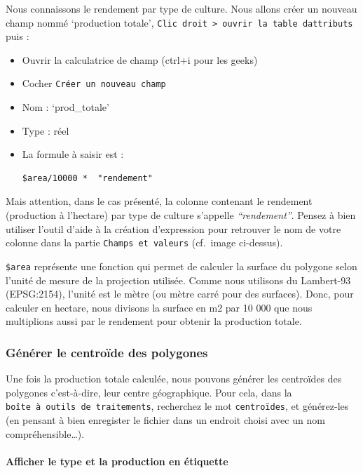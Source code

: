 Nous connaissons le rendement par type de culture. Nous allons créer un
nouveau champ nommé `production totale',
\texttt{Clic\ droit\ \textgreater{}\ ouvrir\ la\ table\ d\textquotesingle{}attributs}
puis :

\begin{itemize}
\item
  Ouvrir la calculatrice de champ (ctrl+i pour les geeks)
\item
  Cocher \texttt{Créer\ un\ nouveau\ champ}
\item
  Nom : `prod\_totale'
\item
  Type : réel
\item
  La formule à saisir est :

\begin{verbatim}
$area/10000 *  "rendement"
\end{verbatim}
\end{itemize}

Mais attention, dans le cas présenté, la colonne contenant le rendement
(production à l'hectare) par type de culture s'appelle
\emph{``rendement''}. Pensez à bien utiliser l'outil d'aide à la
création d'expression pour retrouver le nom de votre colonne dans la
partie \texttt{Champs\ et\ valeurs} (cf.~image ci-dessus).

\texttt{\$area} représente une fonction qui permet de calculer la
surface du polygone selon l'unité de mesure de la projection utilisée.
Comme nous utilisons du Lambert-93 (EPSG:2154), l'unité est le mètre (ou
mètre carré pour des surfaces). Donc, pour calculer en hectare, nous
divisons la surface en m2 par 10 000 que nous multiplions aussi par le
rendement pour obtenir la production totale.

\subsubsection{Générer le centroïde des
polygones}\label{guxe9nuxe9rer-le-centrouxefde-des-polygones}

Une fois la production totale calculée, nous pouvons générer les
centroïdes des polygones c'est-à-dire, leur centre géographique. Pour
cela, dans la \texttt{boîte\ à\ outils\ de\ traitements}, recherchez le
mot \texttt{centroïdes}, et générez-les (en pensant à bien enregister le
fichier dans un endroit choisi avec un nom compréhensible\ldots{}).

\paragraph{Afficher le type et la production en
étiquette}\label{afficher-le-type-et-la-production-en-uxe9tiquette}

